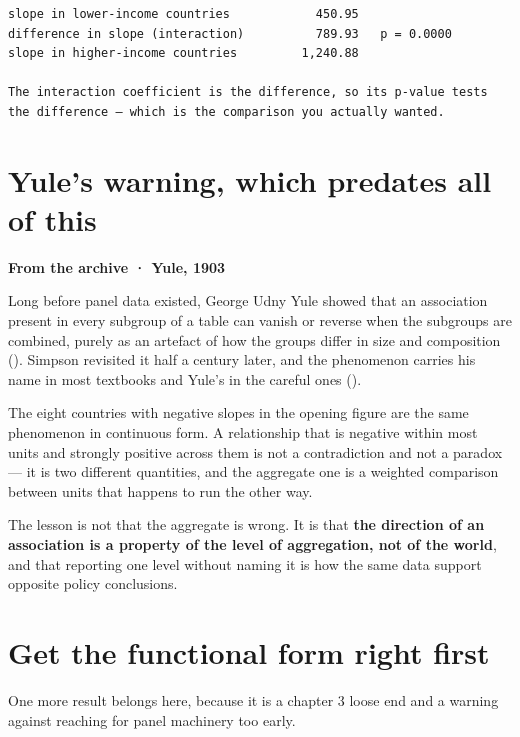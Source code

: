 \documentclass[
  letterpaper,
  10pt,
  twoside,
  openright,
  numbers=noenddot,
  chapterprefix=true]{scrbook}
\newenvironment{qmibarchive}
  {\par\medskip\noindent{\color{econgold}\rule{\linewidth}{1.4pt}}%
   \par\nobreak\vspace{4pt}\noindent\ignorespaces}
  {\par\vspace{2pt}\noindent{\color{econrule}\rule{\linewidth}{0.4pt}}\par\medskip}
\begin{document}
\begin{verbatim}
slope in lower-income countries            450.95
difference in slope (interaction)          789.93   p = 0.0000
slope in higher-income countries         1,240.88

The interaction coefficient is the difference, so its p-value tests
the difference — which is the comparison you actually wanted.
\end{verbatim}

\section{Yule's warning, which predates all of
this}\label{yules-warning-which-predates-all-of-this}

\begin{qmibarchive}

\textbf{From the archive · Yule, 1903}

Long before panel data existed, George Udny Yule showed that an
association present in every subgroup of a table can vanish or reverse
when the subgroups are combined, purely as an artefact of how the groups
differ in size and composition ().
Simpson revisited it half a century later, and the phenomenon carries
his name in most textbooks and Yule's in the careful ones
().

The eight countries with negative slopes in the opening figure are the
same phenomenon in continuous form. A relationship that is negative
within most units and strongly positive across them is not a
contradiction and not a paradox --- it is two different quantities, and
the aggregate one is a weighted comparison between units that happens to
run the other way.

The lesson is not that the aggregate is wrong. It is that \textbf{the
direction of an association is a property of the level of aggregation,
not of the world}, and that reporting one level without naming it is how
the same data support opposite policy conclusions.

\end{qmibarchive}

\section{Get the functional form right
first}\label{get-the-functional-form-right-first}

One more result belongs here, because it is a chapter 3 loose end and a
warning against reaching for panel machinery too early.
\end{document}
